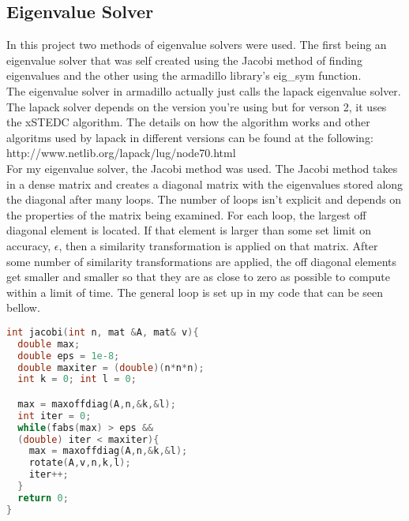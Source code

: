\documentclass[%
 reprint,
 amsmath,amssymb,
 aps,
]{revtex4-1}
\begin{document}
\subsection{Eigenvalue Solver}
In this project two methods of eigenvalue solvers were used. The first being an eigenvalue solver that was self created using the Jacobi method of finding eigenvalues and the other using the armadillo library's eig\_sym function. \\

The eigenvalue solver in armadillo actually just calls the lapack eigenvalue solver. The lapack solver depends on the version you're using but for verson 2, it uses the xSTEDC algorithm. The details on how the algorithm works and other algoritms used by lapack in different versions can be found at the following: http://www.netlib.org/lapack/lug/node70.html \\

For my eigenvalue solver, the Jacobi method was used. The Jacobi method takes in a dense matrix and creates a diagonal matrix with the eigenvalues stored along the diagonal after many loops. The number of loops isn't explicit and depends on the properties of the matrix being examined. For each loop, the largest off diagonal element is located. If that element is larger than some set limit on accuracy, $\epsilon$, then a similarity transformation is applied on that matrix. After some number of similarity transformations are applied, the off diagonal elements get smaller and smaller so that they are as close to zero as possible to compute within a limit of time. The general loop is set up in my code that can be seen bellow. \\

\begin{lstlisting}[language=c++, caption=Jacobi method]
int jacobi(int n, mat &A, mat& v){
  double max;
  double eps = 1e-8;
  double maxiter = (double)(n*n*n);
  int k = 0; int l = 0;

  max = maxoffdiag(A,n,&k,&l);
  int iter = 0;
  while(fabs(max) > eps && 
  (double) iter < maxiter){
    max = maxoffdiag(A,n,&k,&l);
    rotate(A,v,n,k,l);
    iter++;
  }
  return 0;
}
\end{lstlisting}
\end{document}
